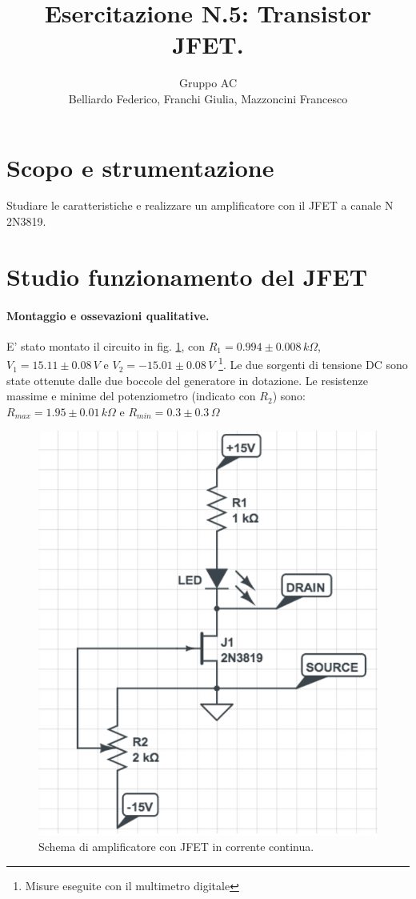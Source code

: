\documentclass[10pt,a4paper]{article}
\author{Gruppo AC \\ Belliardo Federico, Franchi Giulia, Mazzoncini Francesco}
\title{Esercitazione N.5: Transistor JFET.}
\begin{document}
\maketitle

\section{Scopo e strumentazione}
Studiare le caratteristiche e realizzare un amplificatore con il JFET a canale N 2N3819.

\section{Studio funzionamento del JFET}
\paragraph{Montaggio e ossevazioni qualitative.}
E' stato montato il circuito in fig. \ref{circuito1}, con  $R_1 = 0.994\pm0.008 \, k\Omega$, $V_1 = 15.11\pm0.08 \, V$ e $V_2 = -15.01 \pm 0.08 \, V$ \footnote{Misure eseguite con il multimetro digitale}. Le due sorgenti di tensione DC sono state ottenute dalle due boccole del generatore in dotazione. Le resistenze massime e minime del potenziometro (indicato con $R_2$) sono:  $R_{max} = 1.95 \pm 0.01 \, k\Omega$ e $R_{min} = 0.3 \pm 0.3 \, \Omega$

\begin{figure}
\centering
\includegraphics[scale=0.4]{circuito1.png}
\caption{Schema di amplificatore con JFET in corrente continua.\label{circuito1}}
\end{figure}
\end{document}
